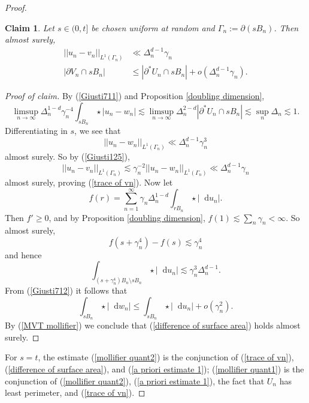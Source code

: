\documentclass[reqno,10pt]{amsart}
\newcommand*\dif{\mathop{}\!\mathrm{d}}
\newtheorem{claim}{Claim}[theorem]
\theoremstyle{definition}
\numberwithin{equation}{section}
\begin{document}
\begin{proof}
\begin{claim}
Let $s \in (0, t]$ be chosen uniform at random and $\Gamma_n := \partial(sB_n)$.
Then almost surely, 
\begin{align}
||u_n - v_n||_{L^1(\Gamma_n)} &\ll \Delta_n^{d - 1} \gamma_n \label{trace of vn} \\
|\partial V_n \cap sB_n| &\leq |\partial^* U_n \cap sB_n| + o(\Delta_n^{d - 1} \gamma_n). \label{difference of surface area}
\end{align}
\end{claim}
\begin{proof}[Proof of claim]
By (\ref{Giusti711}) and Proposition \ref{doubling dimension},
$$\limsup_{n \to \infty} \Delta_n^{1 - d} \gamma_n^{-4} \int_{sB_n} \star |u_n - w_n| \lesssim \limsup_{n \to \infty} \Delta_n^{2-d} |\partial^* U_n \cap sB_n| \lesssim \sup_n \Delta_n \lesssim 1.$$
Differentiating in $s$, we see that
$$||u_n - w_n||_{L^1(\Gamma_n)} \ll \Delta_n^{d - 1} \gamma_n^3$$
almost surely. So by (\ref{Giusti125}),
$$||u_n - v_n||_{L^1(\Gamma_n)} \lesssim \gamma_n^{-2} ||u_n - w_n||_{L^1(\Gamma_n)} \ll \Delta_n^{d - 1} \gamma_n$$
almost surely, proving (\ref{trace of vn}).
Now let
$$f(r) = \sum_{n=1}^\infty \gamma_n \Delta_n^{1 - d} \int_{rB_n} \star |\dif u_n|.$$
Then $f' \geq 0$, and by Proposition \ref{doubling dimension}, $f(1) \lesssim \sum_n \gamma_n < \infty$.
So almost surely,
$$f(s + \gamma_n^4) - f(s) \lesssim \gamma_n^4$$
and hence
$$\int_{(s + \gamma_n^4)B_n \setminus sB_n} \star |\dif u_n| \lesssim \gamma_n^3 \Delta_n^{d - 1}.$$
From (\ref{Giusti712}) it follows that
$$\int_{sB_n} \star |\dif w_n| \leq \int_{sB_n} \star |\dif u_n| + o(\gamma_n^2).$$
By (\ref{MVT mollifier}) we conclude that (\ref{difference of surface area}) holds almost surely.
\end{proof}

For $s = t$, the estimate (\ref{mollifier quant2}) is the conjunction of (\ref{trace of vn}), (\ref{difference of surface area}), and (\ref{a priori estimate 1});
(\ref{mollifier quant1}) is the conjunction of (\ref{mollifier quant2}), (\ref{a priori estimate 1}), the fact that $U_n$ has least perimeter, and (\ref{trace of vn}).


\end{proof}
\end{document}
